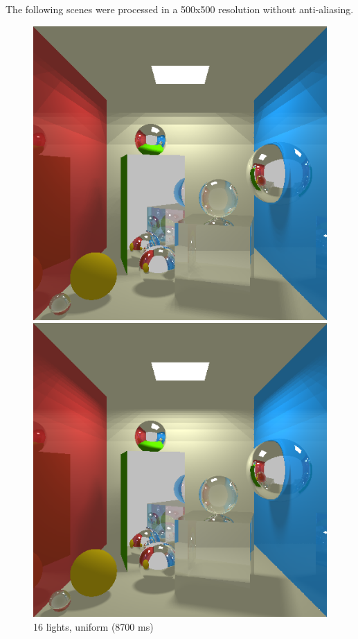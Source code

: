 The following scenes were processed in a 500x500 resolution without anti-aliasing.
\begin{figure}[H]
    \centering
    \includegraphics[width=\linewidth]{img/shadows/16.png}
    \caption{16 lights, uniform (8700 ms)}
\endminipage\hfill
{}
    \centering
    \includegraphics[width=\linewidth]{img/shadows/64.png}

\end{figure}
